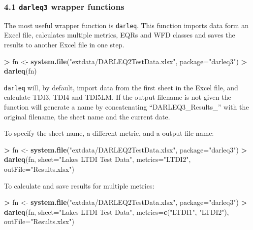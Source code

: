 \documentclass[]{article}
\newenvironment{Shaded}{\begin{snugshade}}{\end{snugshade}}
\newcommand{\DataTypeTok}[1]{\textcolor[rgb]{0.13,0.29,0.53}{#1}}
\newcommand{\KeywordTok}[1]{\textcolor[rgb]{0.13,0.29,0.53}{\textbf{#1}}}
\newcommand{\NormalTok}[1]{#1}
\newcommand{\OperatorTok}[1]{\textcolor[rgb]{0.81,0.36,0.00}{\textbf{#1}}}
\newcommand{\StringTok}[1]{\textcolor[rgb]{0.31,0.60,0.02}{#1}}
\begin{document}
\hypertarget{darleq3-wrapper-functions}{%
\subsubsection{\texorpdfstring{4.1 \texttt{darleq3} wrapper
functions}{4.1 darleq3 wrapper functions}}\label{darleq3-wrapper-functions}}

The most useful wrapper function is \texttt{darleq}. This function
imports data form an Excel file, calculates multiple metrics, EQRs and
WFD classes and saves the results to another Excel file in one step.

\begin{Shaded}
\begin{Highlighting}[]
\OperatorTok{>}\StringTok{ }\NormalTok{fn <-}\StringTok{ }\KeywordTok{system.file}\NormalTok{(}\StringTok{"extdata/DARLEQ2TestData.xlsx"}\NormalTok{, }\DataTypeTok{package=}\StringTok{"darleq3"}\NormalTok{)}
\OperatorTok{>}\StringTok{ }\KeywordTok{darleq}\NormalTok{(fn)}
\end{Highlighting}
\end{Shaded}

\texttt{darleq} will, by default, import data from the first sheet in
the Excel file, and calculate TDI3, TDI4 and TDI5LM. If the output
filename is not given the function will generate a name by concatenating
``DARLEQ3\_Results\_'' with the original filename, the sheet name and
the current date.

To specify the sheet name, a different metric, and a output file name:

\begin{Shaded}
\begin{Highlighting}[]
\OperatorTok{>}\StringTok{ }\NormalTok{fn <-}\StringTok{ }\KeywordTok{system.file}\NormalTok{(}\StringTok{"extdata/DARLEQ2TestData.xlsx"}\NormalTok{, }\DataTypeTok{package=}\StringTok{"darleq3"}\NormalTok{)}
\OperatorTok{>}\StringTok{ }\KeywordTok{darleq}\NormalTok{(fn, }\DataTypeTok{sheet=}\StringTok{"Lakes LTDI Test Data"}\NormalTok{, }\DataTypeTok{metrics=}\StringTok{"LTDI2"}\NormalTok{, }\DataTypeTok{outFile=}\StringTok{"Results.xlsx"}\NormalTok{)}
\end{Highlighting}
\end{Shaded}

To calculate and save results for multiple metrics:

\begin{Shaded}
\begin{Highlighting}[]
\OperatorTok{>}\StringTok{ }\NormalTok{fn <-}\StringTok{ }\KeywordTok{system.file}\NormalTok{(}\StringTok{"extdata/DARLEQ2TestData.xlsx"}\NormalTok{, }\DataTypeTok{package=}\StringTok{"darleq3"}\NormalTok{)}
\OperatorTok{>}\StringTok{ }\KeywordTok{darleq}\NormalTok{(fn, }\DataTypeTok{sheet=}\StringTok{"Lakes LTDI Test Data"}\NormalTok{, }\DataTypeTok{metrics=}\KeywordTok{c}\NormalTok{(}\StringTok{"LTDI1"}\NormalTok{, }\StringTok{"LTDI2"}\NormalTok{), }\DataTypeTok{outFile=}\StringTok{"Results.xlsx"}\NormalTok{)}
\end{Highlighting}
\end{Shaded}
\end{document}
